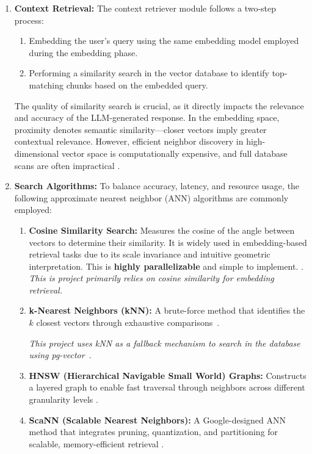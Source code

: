 \begin{enumerate}[label=\alph*.]
  \item \textbf{Context Retrieval:} The context retriever module follows a two-step process:
  \begin{enumerate}
    \item Embedding the user's query using the same embedding model employed during the embedding phase.
    \item Performing a similarity search in the vector database to identify top-matching chunks based on the embedded query.
  \end{enumerate}

  The quality of similarity search is crucial, as it directly impacts the relevance and accuracy of the LLM-generated response. In the embedding space, proximity denotes semantic similarity—closer vectors imply greater contextual relevance. However, efficient neighbor discovery in high-dimensional vector space is computationally expensive, and full database scans are often impractical \cite{sugawara2016approximately}.

  \item \textbf{Search Algorithms:} To balance accuracy, latency, and resource usage, the following approximate nearest neighbor (ANN) algorithms are commonly employed:
  \begin{enumerate}
    \item \textbf{Cosine Similarity Search:} Measures the cosine of the angle between vectors to determine their similarity. It is widely used in embedding-based retrieval tasks due to its scale invariance and intuitive geometric interpretation. 
    This is \textbf{highly parallelizable} and simple to implement. \cite{steck2024cosine}. 
    \textit{This is project primarily relies on cosine similarity for embedding retrieval.}
    
    \item \textbf{k-Nearest Neighbors (kNN):} A brute-force method that identifies the $k$ closest vectors through exhaustive comparisons~\cite{labelbox2023vectorsimilarity}.
    
    \textit{This project uses kNN as a fallback mechanism to search in the database using pg-vector}~\cite{pgvector}.

    \item \textbf{HNSW (Hierarchical Navigable Small World) Graphs:} Constructs a layered graph to enable fast traversal through neighbors across different granularity levels \cite{labelbox2023vectorsimilarity}.
    \item \textbf{ScaNN (Scalable Nearest Neighbors):} A Google-designed ANN method that integrates pruning, quantization, and partitioning for scalable, memory-efficient retrieval \cite{guo2020accelerating}.
  \end{enumerate}



\end{enumerate}
